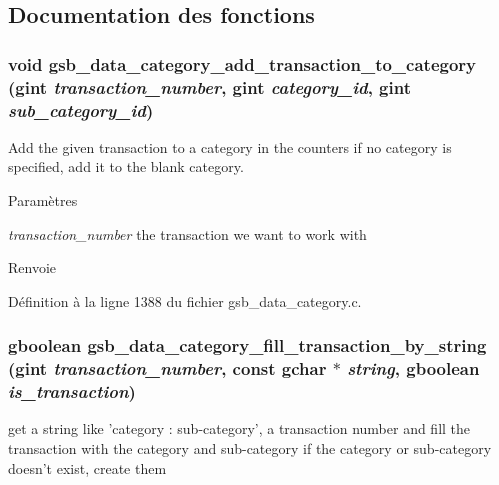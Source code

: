 \subsection{Documentation des fonctions}
\subsubsection[{gsb\_\-data\_\-category\_\-add\_\-transaction\_\-to\_\-category}]{\setlength{\rightskip}{0pt plus 5cm}void gsb\_\-data\_\-category\_\-add\_\-transaction\_\-to\_\-category (gint {\em transaction\_\-number}, \/  gint {\em category\_\-id}, \/  gint {\em sub\_\-category\_\-id})}\label{gsb__data__category_8h_ab0125720f46b82a2e71c823b623008d7}
Add the given transaction to a category in the counters if no category is specified, add it to the blank category.


\begin{DoxyParams}{Paramètres}
\item[{\em transaction\_\-number}]the transaction we want to work with\end{DoxyParams}
\begin{DoxyReturn}{Renvoie}

\end{DoxyReturn}


Définition à la ligne 1388 du fichier gsb\_\-data\_\-category.c.

\subsubsection[{gsb\_\-data\_\-category\_\-fill\_\-transaction\_\-by\_\-string}]{\setlength{\rightskip}{0pt plus 5cm}gboolean gsb\_\-data\_\-category\_\-fill\_\-transaction\_\-by\_\-string (gint {\em transaction\_\-number}, \/  const gchar $\ast$ {\em string}, \/  gboolean {\em is\_\-transaction})}\label{gsb__data__category_8h_ab038a913b9c16fabc45e33f60ea97649}
get a string like 'category : sub-\/category', a transaction number and fill the transaction with the category and sub-\/category if the category or sub-\/category doesn't exist, create them


